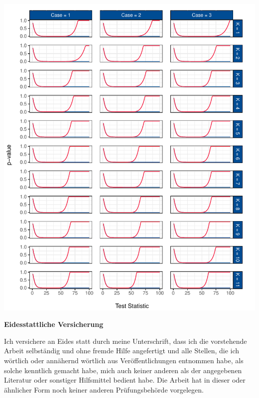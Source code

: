 \documentclass[12pt,a4paper]{article}
\let\origfigure\figure
\let\endorigfigure\endfigure
\renewenvironment{figure}[1][2] {
    \expandafter\origfigure\expandafter[H]
} {
    \endorigfigure
}
\begin{document}
\begin{figure}
\centering
\includegraphics{p_approx_paper_files/figure-latex/p_stat_e_j-1.pdf}
\caption{\label{fig:fig_4} Corrected and uncorrected \(p\)-value
predictions for the first case using Johansen and Engle-Granger as
underlying tests.}
\end{figure}

\restoregeometry

\cleardoublepage
\newpage
\renewcommand*{\mkbibnamefamily}[1]{\textbf{#1}}
\renewcommand*{\mkbibnamegiven}[1]{\textbf{#1}}
\renewcommand*{\mkbibnameprefix}[1]{\textbf{#1}}
\renewcommand*{\mkbibnamesuffix}[1]{\textbf{#1}}




\newpage
\textbf{Eidesstattliche Versicherung}

\bigskip

Ich versichere an Eides statt durch meine Unterschrift, dass ich die vorstehende Arbeit selbständig und ohne fremde Hilfe angefertigt und alle Stellen, die ich wörtlich oder annähernd wörtlich aus Veröffentlichungen entnommen habe, als solche kenntlich gemacht habe, mich auch keiner anderen als der angegebenen Literatur oder sonstiger Hilfsmittel bedient habe. Die Arbeit hat in dieser oder ähnlicher Form noch keiner anderen Prüfungsbehörde vorgelegen.

\vspace{1cm}
\rule{0pt}{2\baselineskip} %
\par\noindent{} \hfill\makebox[2.25in]{\hrulefill}%
\par\noindent\makebox[2.25in][l]{} \hfill{}%
\end{document}
